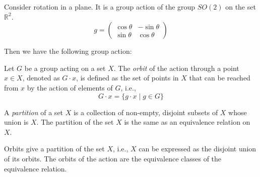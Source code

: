\documentclass[
	11pt, %
	fleqn, %
	a4paper, %
]{LegrandOrangeBook}
\begin{document}
Consider rotation in a plane. It is a group action of the group $SO(2)$ on the set $\mathbb{R}^2$.
\[
    g = \begin{pmatrix}
        \cos{\theta} & -\sin{\theta} \\
        \sin{\theta} & \cos{\theta}
    \end{pmatrix}
\]

Then we have the following group action:
\begin{center}
\end{center}

\begin{definition}[Orbits]
    Let $G$ be a group acting on a set $X$. The \emph{orbit} of the action through a point $x \in X$, denoted as $G \cdot x$, is defined as the set of points in $X$ that can be reached from $x$ by the action of elements of $G$, i.e., 
    \[
        G \cdot x = \{g \cdot x \mid g \in G\}
    \]
\end{definition}

\begin{definition}[Partition]
    A \emph{partition} of a set $X$ is a collection of non-empty, disjoint subsets of $X$ whose union is $X$. The partition of the set $X$ is the same as an equivalence relation on $X$.
\end{definition}

\begin{proposition}
    Orbits give a partition of the set $X$, i.e., $X$ can be expressed as the disjoint union of its orbits. The orbits of the action are the equivalence classes of the equivalence relation.
\end{proposition}
\end{document}
